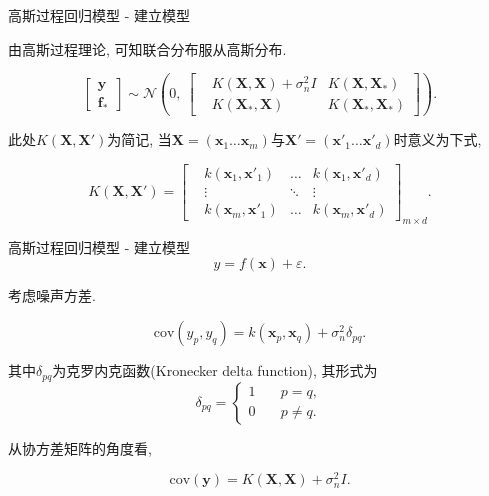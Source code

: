 \documentclass[10pt,mathserif]{beamer}
\theoremstyle{definition}
\numberwithin{equation}{section} %
\begin{document}
    \begin{frame}[fragile]{高斯过程回归模型 - 建立模型}

        由高斯过程理论, 可知联合分布服从高斯分布.
        
        $$\left[\begin{aligned}
            \boldsymbol{y}\ \\
            \boldsymbol{f}_{*}
        \end{aligned}\right]
        \sim\mathcal{N}\left(0,\
        \begin{bmatrix}
            &K(\boldsymbol{X}, \boldsymbol{X}) + \sigma^{2}_{n}I    &K(\boldsymbol{X}, \boldsymbol{X}_{*}) \\
            &K(\boldsymbol{X}_{*}, \boldsymbol{X}) &K(\boldsymbol{X}_{*}, \boldsymbol{X}_{*})
        \end{bmatrix}\right).$$

        此处$K(\boldsymbol{X},\boldsymbol{X}')$为简记, 当$\boldsymbol{X}=(\boldsymbol{x}_{1}\dots \boldsymbol{x}_{m})$与$\boldsymbol{X}'=(\boldsymbol{x}'_{1}\dots \boldsymbol{x}'_{d})$时意义为下式,

        $$K(\boldsymbol{X},\boldsymbol{X}')=  \begin{bmatrix}
            &k(\boldsymbol{x}_{1}, \boldsymbol{x}'_{1})   &\dots      &k(\boldsymbol{x}_{1}, \boldsymbol{x}'_{d}) \\
            &\vdots                                       &\ddots     &\vdots \\
            &k(\boldsymbol{x}_{m}, \boldsymbol{x}'_{1})   &\dots      &k(\boldsymbol{x}_{m}, \boldsymbol{x}'_{d})
        \end{bmatrix}_{m\times d}.$$

    \end{frame}

    \begin{frame}[fragile]{高斯过程回归模型 - 建立模型}
        $$y=f(\boldsymbol{x})+\varepsilon.$$

        考虑噪声方差.

        \begin{equation}
            \mathrm{cov}(y_{p},y_{q})=k(\boldsymbol{x}_{p}, \boldsymbol{x}_{q})+\sigma^{2}_{n}\delta_{pq}.
        \end{equation}

        其中$\delta_{pq}$为克罗内克函数(Kronecker delta function), 其形式为
        \begin{equation}
            \delta_{pq}=
            \begin{cases} 
                1 & \quad p=q,\\ 
                0 & \quad p\neq q.
            \end{cases}
        \end{equation}

        从协方差矩阵的角度看,

        \begin{equation}
            \mathrm{cov}(\boldsymbol{y})=K(\boldsymbol{X}, \boldsymbol{X}) + \sigma^{2}_{n}I.
        \end{equation}
    \end{frame}
\end{document}

